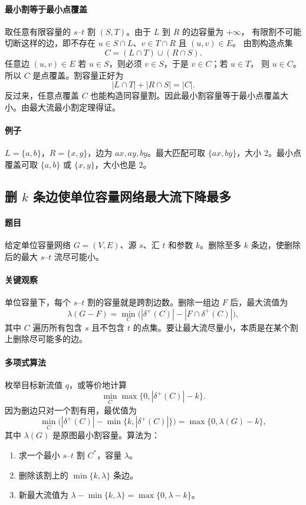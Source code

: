 \documentclass[UTF8,openany,12pt]{ctexbook}
\theoremstyle{remark}
\begin{document}
\paragraph{最小割等于最小点覆盖}
取任意有限容量的 $s$--$t$ 割 $(S,T)$。由于 $L$ 到 $R$ 的边容量为 $+\infty$，
有限割不可能切断这样的边，即不存在 $u\in S\cap L$、$v\in T\cap R$ 且 $(u,v)\in E$。
由割构造点集
\[
  C=(L\cap T)\cup(R\cap S).
\]
任意边 $(u,v)\in E$ 若 $u\in S$，则必须 $v\in S$，于是 $v\in C$；若 $u\in T$，
则 $u\in C$。所以 $C$ 是点覆盖。割容量正好为
\[
  |L\cap T|+|R\cap S|=|C|.
\]
反过来，任意点覆盖 $C$ 也能构造同容量割。因此最小割容量等于最小点覆盖大小。由最大流最小割定理得证。

\paragraph{例子}
$L=\{a,b\}$，$R=\{x,y\}$，边为 $a x,a y,b y$。最大匹配可取
$\{a x,b y\}$，大小 $2$。最小点覆盖可取 $\{a,b\}$ 或 $\{x,y\}$，大小也是 $2$。

\subsection[删 k 条边使单位容量网络最大流下降最多]{删 $k$ 条边使单位容量网络最大流下降最多}

\paragraph{题目}
给定单位容量网络 $G=(V,E)$、源 $s$、汇 $t$ 和参数 $k$。删除至多 $k$ 条边，使删除后的最大
$s$--$t$ 流尽可能小。

\paragraph{关键观察}
单位容量下，每个 $s$--$t$ 割的容量就是跨割边数。删除一组边 $F$ 后，最大流值为
\[
  \lambda(G-F)=\min_C \bigl(|\delta^+(C)|-|F\cap\delta^+(C)|\bigr),
\]
其中 $C$ 遍历所有包含 $s$ 且不包含 $t$ 的点集。要让最大流尽量小，本质是在某个割上删除尽可能多的边。

\paragraph{多项式算法}
枚举目标新流值 $q$，或等价地计算
\[
  \min_C \max\{0,|\delta^+(C)|-k\}.
\]
因为删边只对一个割有用，最优值为
\[
  \min_C \bigl(|\delta^+(C)|-\min\{k,|\delta^+(C)|\}\bigr)
  =\max\{0,\lambda(G)-k\},
\]
其中 $\lambda(G)$ 是原图最小割容量。算法为：
\begin{enumerate}
  \item 求一个最小 $s$--$t$ 割 $C^*$，容量 $\lambda$。
  \item 删除该割上的 $\min\{k,\lambda\}$ 条边。
  \item 新最大流值为 $\lambda-\min\{k,\lambda\}=\max\{0,\lambda-k\}$。
\end{enumerate}
\end{document}
